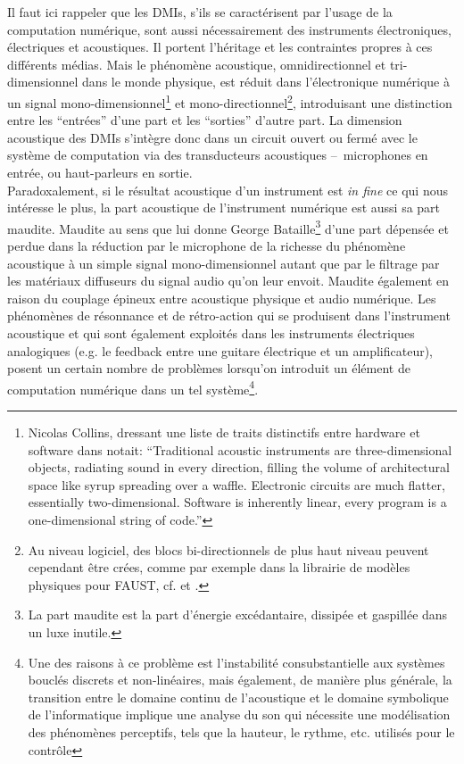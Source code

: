 \noindent Il faut ici rappeler que les \glspl{DMI}, s'ils se caractérisent par l'usage de la computation numérique, sont aussi nécessairement des instruments électroniques, électriques et acoustiques. Il portent l'héritage et les contraintes propres à ces différents médias. Mais le phénomène acoustique, omnidirectionnel et tri-dimensionnel dans le monde physique, est réduit dans l'électronique numérique à un signal mono-dimensionnel\footnote{Nicolas Collins, dressant une liste de traits distinctifs entre hardware et software dans \cite{collins_semiconducting_2013} notait: ``Traditional acoustic instruments are three-dimensional objects, radiating sound in every direction, filling the volume of architectural space like syrup spreading over a waffle. Electronic circuits are much flatter, essentially two-dimensional. Software is inherently linear, every program is a one-dimensional string of code.''} et mono-directionnel\footnote{Au niveau logiciel, des blocs bi-directionnels de plus haut niveau peuvent cependant être crées, comme par exemple dans la librairie de modèles physiques pour \gls{FAUST}, cf. \cite{berdahl_introduction_2012} et \cite{michon_faust_2018}.}, introduisant une distinction entre les ``entrées'' d'une part et les ``sorties'' d'autre part. La dimension acoustique des \glspl{DMI} s'intègre donc dans un circuit ouvert ou fermé avec le système de computation via des transducteurs acoustiques --~microphones en entrée, ou haut-parleurs en sortie.\\
\indent Paradoxalement, si le résultat acoustique d'un instrument est \textit{in fine} ce qui nous intéresse le plus, la part acoustique de l'instrument numérique est aussi sa part maudite. Maudite au sens que lui donne George Bataille\footnote{La part maudite est la part d'énergie excédantaire, dissipée et gaspillée dans un luxe inutile.} d'une part dépensée et perdue dans la réduction par le microphone de la richesse du phénomène acoustique à un simple signal mono-dimensionnel autant que par le filtrage par les matériaux diffuseurs du signal audio qu'on leur envoit. Maudite également en raison du couplage épineux entre acoustique physique et audio numérique. Les phénomènes de résonnance et de rétro-action qui se produisent dans l'instrument acoustique et qui sont également exploités dans les instruments électriques analogiques (e.g. le feedback entre une guitare électrique et un amplificateur), posent un certain nombre de problèmes lorsqu'on introduit un élément de computation numérique dans un tel système\footnote{Une des raisons à ce problème est l'instabilité consubstantielle aux systèmes bouclés discrets et non-linéaires, mais également, de manière plus générale, la transition entre le domaine continu de l'acoustique et le domaine symbolique de l'informatique implique une analyse du son qui nécessite une modélisation des phénomènes perceptifs, tels que la hauteur, le rythme, etc. utilisés pour le contrôle}.\\
